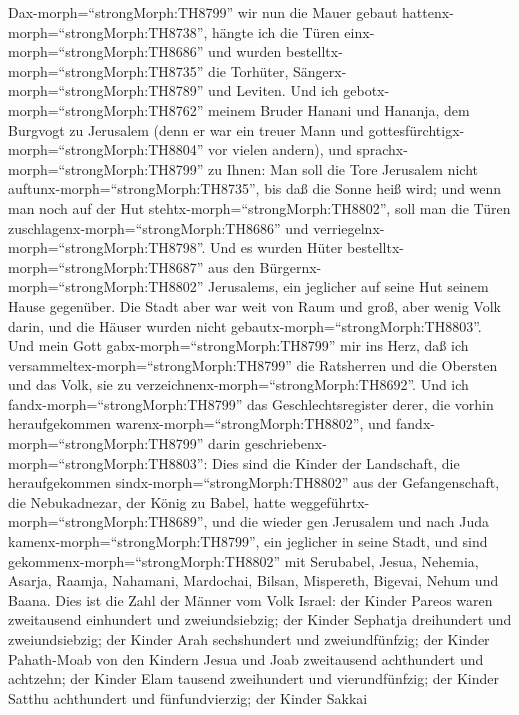 Dax-morph=``strongMorph:TH8799'' wir nun die Mauer gebaut
hattenx-morph=``strongMorph:TH8738'', hängte ich die Türen
einx-morph=``strongMorph:TH8686'' und wurden
bestelltx-morph=``strongMorph:TH8735'' die Torhüter,
Sängerx-morph=``strongMorph:TH8789'' und Leviten.  Und ich
gebotx-morph=``strongMorph:TH8762'' meinem Bruder Hanani und Hananja,
dem Burgvogt zu Jerusalem (denn er war ein treuer Mann und
gottesfürchtigx-morph=``strongMorph:TH8804'' vor vielen andern),
 und sprachx-morph=``strongMorph:TH8799'' zu Ihnen: Man soll
die Tore Jerusalem nicht auftunx-morph=``strongMorph:TH8735'', bis daß
die Sonne heiß wird; und wenn man noch auf der Hut
stehtx-morph=``strongMorph:TH8802'', soll man die Türen
zuschlagenx-morph=``strongMorph:TH8686'' und
verriegelnx-morph=``strongMorph:TH8798''. Und es wurden Hüter
bestelltx-morph=``strongMorph:TH8687'' aus den
Bürgernx-morph=``strongMorph:TH8802'' Jerusalems, ein jeglicher auf
seine Hut seinem Hause gegenüber.  Die Stadt aber war weit
von Raum und groß, aber wenig Volk darin, und die Häuser wurden nicht
gebautx-morph=``strongMorph:TH8803''.  Und mein Gott
gabx-morph=``strongMorph:TH8799'' mir ins Herz, daß ich
versammeltex-morph=``strongMorph:TH8799'' die Ratsherren und die
Obersten und das Volk, sie zu verzeichnenx-morph=``strongMorph:TH8692''.
Und ich fandx-morph=``strongMorph:TH8799'' das Geschlechtsregister
derer, die vorhin heraufgekommen warenx-morph=``strongMorph:TH8802'',
und fandx-morph=``strongMorph:TH8799'' darin
geschriebenx-morph=``strongMorph:TH8803'':  Dies sind die
Kinder der Landschaft, die heraufgekommen
sindx-morph=``strongMorph:TH8802'' aus der Gefangenschaft, die
Nebukadnezar, der König zu Babel, hatte
weggeführtx-morph=``strongMorph:TH8689'', und die wieder gen Jerusalem
und nach Juda kamenx-morph=``strongMorph:TH8799'', ein jeglicher in
seine Stadt,  und sind
gekommenx-morph=``strongMorph:TH8802'' mit Serubabel, Jesua, Nehemia,
Asarja, Raamja, Nahamani, Mardochai, Bilsan, Mispereth, Bigevai, Nehum
und Baana. Dies ist die Zahl der Männer vom Volk Israel: 
der Kinder Pareos waren zweitausend einhundert und zweiundsiebzig;
 der Kinder Sephatja dreihundert und zweiundsiebzig;
 der Kinder Arah sechshundert und zweiundfünfzig;
 der Kinder Pahath-Moab von den Kindern Jesua und Joab
zweitausend achthundert und achtzehn;  der Kinder Elam
tausend zweihundert und vierundfünfzig;  der Kinder Satthu
achthundert und fünfundvierzig;  der Kinder Sakkai
